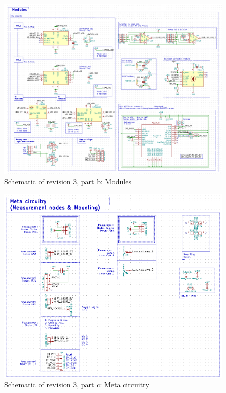 \begin{figure}[h]
	\centering
    \includegraphics[width=\linewidth]{Figures/schem_r3_b.png}
	\caption{Schematic of revision 3, part b: Modules}
	\label{fig:schr3b}
\end{figure}
\begin{figure}[h]
	\centering
    \includegraphics[width=\linewidth]{Figures/schem_r3_c.png}
	\caption{Schematic of revision 3, part c: Meta circuitry}
	\label{fig:schr3c}
\end{figure}

\clearpage
